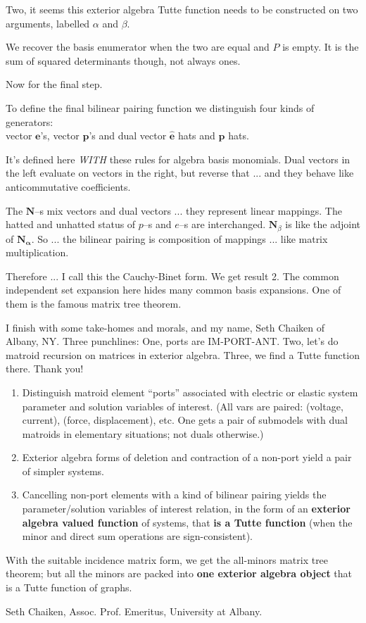 \documentclass{article}
\begin{document}


  Two, it seems this exterior algebra Tutte function needs to be constructed on 
  two arguments, labelled $\alpha$ and $\beta$.


  We recover the basis enumerator when the two are equal and $P$ is empty.  It
  is the sum of squared determinants though, not always ones.

 Now for the final step.


  To define the final bilinear pairing function 
  we distinguish 
  four kinds of generators:\\
  vector $\mathbf{e}$'s, vector $\mathbf{p}$'s and
dual vector $\widehat{\mathbf{e}}$ hats and $\widehat{\mathbf{p}}$ hats.  


  It's defined here \emph{WITH} these rules for algebra basis monomials.  Dual vectors
  in the left evaluate on vectors in the right, but reverse that ... and
  they behave like anticommutative coefficients.


  The $\mathbf{N}$--s mix vectors and dual vectors ... they represent linear mappings.
  The hatted and unhatted status of $p$--s and $e$--s are interchanged.
  $\mathbf{N}_\beta$ is like the adjoint of $\mathbf{N_\alpha}$.  So ... the
  bilinear pairing is composition of mappings  ... like matrix multiplication.


  Therefore ... I call this the Cauchy-Binet form.  We get result 2.
  The common independent set expansion here hides many common basis
  expansions.  One of them is the famous matrix tree theorem.

\pagebreak

  I finish with some take-homes and morals, and my name, Seth Chaiken
  of Albany, NY.
  Three punchlines:  One, ports are IM-PORT-ANT.
  Two, let's do matroid recursion on matrices in exterior algebra.
  Three, we find a Tutte function there.
  Thank you!

  \begin{enumerate}
  \item
    Distinguish matroid element ``ports'' associated with 
    electric or elastic system parameter and solution variables of interest.
    (All vars are paired: (voltage, current), (force, displacement), etc.
    One gets a pair of submodels with dual matroids in elementary
    situations; not duals otherwise.)
  \item
    Exterior algebra forms of deletion and contraction of a non-port
    yield a pair of simpler systems.
  \item
    Cancelling non-port elements with a kind of bilinear pairing
    yields the parameter/solution variables of interest relation,
    in the form of an
    \textbf{exterior algebra valued function} of systems,
    that \textbf{is a Tutte function} (when the minor and
    direct sum operations are sign-consistent).
  \end{enumerate}

  With the suitable incidence matrix form, we get the all-minors matrix tree
  theorem; but all the minors are packed into \textbf{one exterior algebra
    object} that is a Tutte function of graphs.

  Seth Chaiken, Assoc. Prof. Emeritus, University at Albany.
\end{document}

